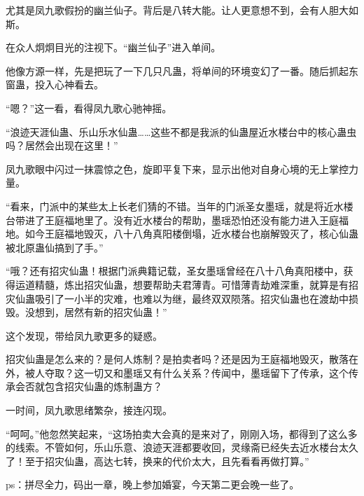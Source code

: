 \begin{this_body}
尤其是凤九歌假扮的幽兰仙子。背后是八转大能。让人更意想不到，会有人胆大如斯。

在众人炯炯目光的注视下。“幽兰仙子”进入单间。

他像方源一样，先是把玩了一下几只凡蛊，将单间的环境变幻了一番。随后抓起东窗蛊，投入心神看去。

“嗯？”这一看，看得凤九歌心驰神摇。

“浪迹天涯仙蛊、乐山乐水仙蛊……这些不都是我派的仙蛊屋近水楼台中的核心蛊虫吗？居然会出现在这里！”

凤九歌眼中闪过一抹震惊之色，旋即平复下来，显示出他对自身心境的无上掌控力量。

“看来，门派中的某些太上长老们猜的不错。当年的门派圣女墨瑶，就是将近水楼台带进了王庭福地里了。没有近水楼台的帮助，墨瑶恐怕还没有能力进入王庭福地。如今王庭福地毁灭，八十八角真阳楼倒塌，近水楼台也崩解毁灭了，核心仙蛊被北原蛊仙搞到了手。”

“哦？还有招灾仙蛊！根据门派典籍记载，圣女墨瑶曾经在八十八角真阳楼中，获得运道精髓，炼出招灾仙蛊，想要帮助夫君薄青。可惜薄青劫难深重，就算是有招灾仙蛊吸引了一小半的灾难，也难以为继，最终双双陨落。招灾仙蛊也在渡劫中损毁。没想到，居然有新的招灾仙蛊！”

这个发现，带给凤九歌更多的疑惑。

招灾仙蛊是怎么来的？是何人炼制？是拍卖者吗？还是因为王庭福地毁灭，散落在外，被人夺取？这一切又和墨瑶又有什么关系？传闻中，墨瑶留下了传承，这个传承会否就包含招灾仙蛊的炼制蛊方？

一时间，凤九歌思绪繁杂，接连闪现。

“呵呵。”他忽然笑起来，“这场拍卖大会真的是来对了，刚刚入场，都得到了这么多的线索。不管如何，乐山乐意、浪迹天涯都要收回，灵缘斋已经失去近水楼台太久了！至于招灾仙蛊，高达七转，换来的代价太大，且先看看再做打算。”

ps：拼尽全力，码出一章，晚上参加婚宴，今天第二更会晚一些了。

\end{this_body}

